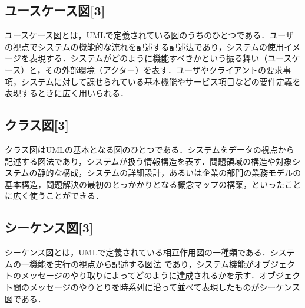 \subsection*{ユースケース図[3]}

ユースケース図とは，UMLで定義されている図のうちのひとつである．ユーザの視点でシステムの機能的な流れを記述する記述法\cite{soft}であり，システムの使用イメージを表現する．システムがどのように機能すべきかという振る舞い（ユースケース）と，その外部環境（アクター）を表す．ユーザやクライアントの要求事項，システムに対して課せられている基本機能やサービス項目などの要件定義を表現するときに広く用いられる．

\subsection*{クラス図[3]}

クラス図はUMLの基本となる図のひとつである．システムをデータの視点から記述する図法\cite{soft}であり，システムが扱う情報構造を表す．問題領域の構造や対象システムの静的な構成，システムの詳細設計，あるいは企業の部門の業務モデルの基本構造，問題解決の最初のとっかかりとなる概念マップの構築，といったことに広く使うことができる．

\subsection*{シーケンス図[3]}

シーケンス図とは，UMLで定義されている相互作用図の一種類である．システムの一機能を実行の視点から記述する図法\cite{soft}	であり，システム機能がオブジェクトのメッセージのやり取りによってどのように達成されるかを示す．オブジェクト間のメッセージのやりとりを時系列に沿って並べて表現したものがシーケンス図である．